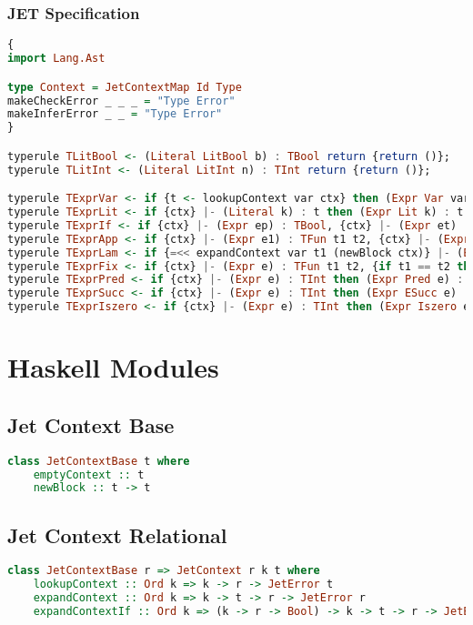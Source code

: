 \subsection{JET Specification}
\begin{lstlisting}[language=Haskell]
{
import Lang.Ast

type Context = JetContextMap Id Type
makeCheckError _ _ _ = "Type Error"
makeInferError _ _ = "Type Error"
}

typerule TLitBool <- (Literal LitBool b) : TBool return {return ()};
typerule TLitInt <- (Literal LitInt n) : TInt return {return ()};

typerule TExprVar <- if {t <- lookupContext var ctx} then (Expr Var var) : t return {return ()};
typerule TExprLit <- if {ctx} |- (Literal k) : t then (Expr Lit k) : t return {return ()} ;
typerule TExprIf <- if {ctx} |- (Expr ep) : TBool, {ctx} |- (Expr et) : t, {ctx} |- (Expr ef) : t then (Expr If ep et ef) : t return {return ()};
typerule TExprApp <- if {ctx} |- (Expr e1) : TFun t1 t2, {ctx} |- (Expr e2) : t1 then (Expr App e1 e2) : t2 return {return ()};
typerule TExprLam <- if {=<< expandContext var t1 (newBlock ctx)} |- (Expr e) : t2 then (Expr Lam var t1 e) : TFun t1 t2 return {return ()};
typerule TExprFix <- if {ctx} |- (Expr e) : TFun t1 t2, {if t1 == t2 then return () else fail "Type error"} then (Expr Fix e) : t1 return {return ()};
typerule TExprPred <- if {ctx} |- (Expr e) : TInt then (Expr Pred e) : TInt return {return ()};
typerule TExprSucc <- if {ctx} |- (Expr e) : TInt then (Expr ESucc e) : TInt return {return ()};
typerule TExprIszero <- if {ctx} |- (Expr e) : TInt then (Expr Iszero e) : TBool return {return ()};
\end{lstlisting}

\chapter{Haskell Modules}
\label{appendix:modules}
\section{Jet Context Base}
\begin{lstlisting}[language=Haskell]
class JetContextBase t where
    emptyContext :: t
    newBlock :: t -> t
\end{lstlisting}
\section{Jet Context Relational}
\begin{lstlisting}[language=Haskell]
class JetContextBase r => JetContext r k t where
    lookupContext :: Ord k => k -> r -> JetError t
    expandContext :: Ord k => k -> t -> r -> JetError r
    expandContextIf :: Ord k => (k -> r -> Bool) -> k -> t -> r -> JetError r
\end{lstlisting}
